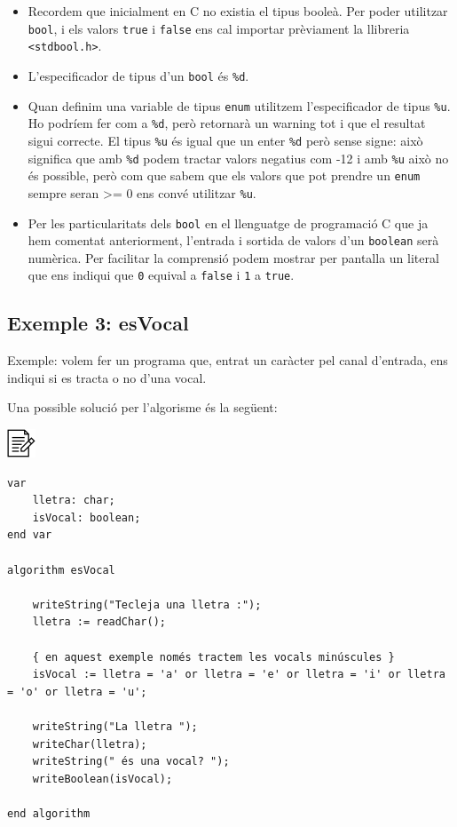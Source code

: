 \documentclass[
]{book}
\providecommand{\tightlist}{%
  \setlength{\itemsep}{0pt}\setlength{\parskip}{0pt}}
\begin{document}
\begin{itemize}
\tightlist
\item
  Recordem que inicialment en C no existia el tipus booleà. Per poder utilitzar \texttt{bool}, i els valors \texttt{true} i \texttt{false} ens cal importar prèviament la llibreria \texttt{\textless{}stdbool.h\textgreater{}}.
\item
  L'especificador de tipus d'un \texttt{bool} és \texttt{\%d}.
\item
  Quan definim una variable de tipus \texttt{enum} utilitzem l'especificador de tipus \texttt{\%u}. Ho podríem fer com a \texttt{\%d}, però retornarà un warning tot i que el resultat sigui correcte. El tipus \texttt{\%u} és igual que un enter \texttt{\%d} però sense signe: això significa que amb \texttt{\%d} podem tractar valors negatius com -12 i amb \texttt{\%u} això no és possible, però com que sabem que els valors que pot prendre un \texttt{enum} sempre seran \textgreater= 0 ens convé utilitzar \texttt{\%u}.
\item
  Per les particularitats dels \texttt{bool} en el llenguatge de programació C que ja hem comentat anteriorment, l'entrada i sortida de valors d'un \texttt{boolean} serà numèrica. Per facilitar la comprensió podem mostrar per pantalla un literal que ens indiqui que \texttt{0} equival a \texttt{false} i \texttt{1} a \texttt{true}.
\end{itemize}

\hypertarget{exemple-3-esvocal}{%
\subsection{Exemple 3: esVocal}\label{exemple-3-esvocal}}

Exemple: volem fer un programa que, entrat un caràcter pel canal d'entrada, ens indiqui si es tracta o no d'una vocal.

Una possible solució per l'algorisme és la següent:

\includegraphics{./img/alg.png}

\begin{verbatim}
var
    lletra: char;
    isVocal: boolean;
end var

algorithm esVocal

    writeString("Tecleja una lletra :");
    lletra := readChar();

    { en aquest exemple només tractem les vocals minúscules }
    isVocal := lletra = 'a' or lletra = 'e' or lletra = 'i' or lletra = 'o' or lletra = 'u';

    writeString("La lletra ");
    writeChar(lletra);
    writeString(" és una vocal? ");
    writeBoolean(isVocal);

end algorithm
\end{verbatim}
\end{document}
